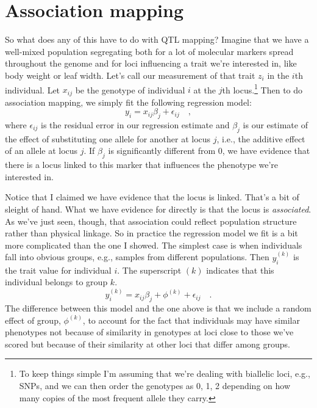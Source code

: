 \section*{Association mapping}

So what does any of this have to do with QTL mapping? Imagine that we
have a well-mixed population segregating both for a lot of molecular
markers spread throughout the genome and for loci influencing a trait
we're interested in, like body weight or leaf width. Let's call our
measurement of that trait $z_i$ in the $i$th individual. Let $x_{ij}$
be the genotype of individual $i$ at the $j$th locus.\footnote{To keep
  things simple I'm assuming that we're dealing with biallelic loci,
  e.g., SNPs, and we can then order the genotypes as 0, 1, 2 depending
  on how many copies of the most frequent allele they carry.} Then to
do association mapping, we simply fit the following regression model:
\[
y_i = x_{ij}\beta_j + \epsilon_{ij} \quad ,
\]
where $\epsilon_{ij}$ is the residual error in our regression estimate
and $\beta_j$ is our estimate of the effect of substituting one allele
for another at locus $j$, i.e., the additive effect of an allele at
locus $j$. If $\beta_j$ is significantly different from 0, we have
evidence that there is a locus linked to this marker that influences
the phenotype we're interested in.

Notice that I claimed we have evidence that the locus is
linked. That's a bit of sleight of hand. What we have evidence for
directly is that the locus is {\it associated}. As we've just seen,
though, that association could reflect population structure rather
than physical linkage. So in practice the regression model we fit is a
bit more complicated than the one I showed. The simplest case is when
individuals fall into obvious groups, e.g., samples from different
populations. Then $y_i^{(k)}$ is the trait value for individual
$i$. The superscript $(k)$ indicates that this individual belongs to
group $k$.
\[
y_i^{(k)} = x_{ij}\beta_j + \phi^{(k)} + \epsilon_{ij} \quad .
\]
The difference between this model and the one above is that we include
a random effect of group, $\phi^{(k)}$, to account for the fact that
individuals may have similar phenotypes not because of similarity in
genotypes at loci close to those we've scored but because of their
similarity at other loci that differ among groups.


